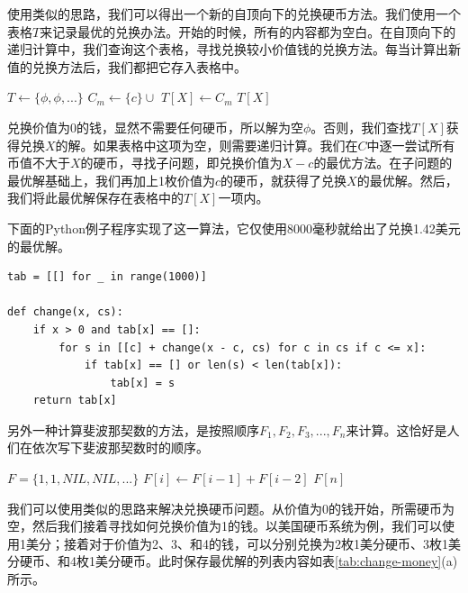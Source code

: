 \documentclass[b5paper]{ctexart}
\begin{document}
使用类似的思路，我们可以得出一个新的自顶向下的兑换硬币方法。我们使用一个表格$T$来记录最优的兑换办法。开始的时候，所有的内容都为空白。在自顶向下的递归计算中，我们查询这个表格，寻找兑换较小价值钱的兑换方法。每当计算出新值的兑换方法后，我们都把它存入表格中。

\begin{algorithmic}[1]
\State $T \gets \{\phi, \phi, ...\}$
        \State $C_m \gets \{c\} \cup$ 
          \State $T[X] \gets C_m$
        \EndIf
      \EndIf
    \EndFor
  \EndIf
  \State \Return $T[X]$
\EndFunction
\end{algorithmic}

兑换价值为0的钱，显然不需要任何硬币，所以解为空$\phi$。否则，我们查找$T[X]$获得兑换$X$的解。如果表格中这项为空，则需要递归计算。我们在$C$中逐一尝试所有币值不大于$X$的硬币，寻找子问题，即兑换价值为$X-c$的最优方法。在子问题的最优解基础上，我们再加上1枚价值为$c$的硬币，就获得了兑换$X$的最优解。然后，我们将此最优解保存在表格中的$T[X]$一项内。

下面的Python例子程序实现了这一算法，它仅使用8000毫秒就给出了兑换1.42美元的最优解。

\lstset{language=Python}
\begin{lstlisting}
tab = [[] for _ in range(1000)]

def change(x, cs):
    if x > 0 and tab[x] == []:
        for s in [[c] + change(x - c, cs) for c in cs if c <= x]:
            if tab[x] == [] or len(s) < len(tab[x]):
                tab[x] = s
    return tab[x]
\end{lstlisting}

另外一种计算斐波那契数的方法，是按照顺序$F_1, F_2, F_3, ..., F_n$来计算。这恰好是人们在依次写下斐波那契数时的顺序。

\begin{algorithmic}[1]
  \State $F = \{1, 1, NIL, NIL, ...\}$
    \State $F[i] \gets F[i-1] + F[i-2]$
  \EndFor
  \State \Return $F[n]$
\EndFunction
\end{algorithmic}

我们可以使用类似的思路来解决兑换硬币问题。从价值为0的钱开始，所需硬币为空，然后我们接着寻找如何兑换价值为1的钱。以美国硬币系统为例，我们可以使用1美分；接着对于价值为2、3、和4的钱，可以分别兑换为2枚1美分硬币、3枚1美分硬币、和4枚1美分硬币。此时保存最优解的列表内容如表\ref{tab:change-money}(a)所示。
\end{document}
